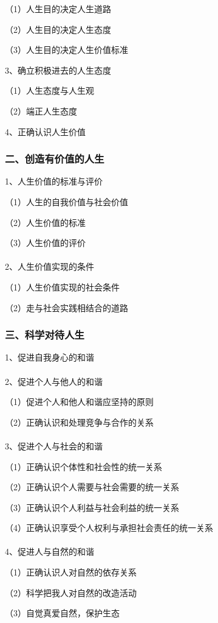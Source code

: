 \documentclass{ctexart}
\begin{document}
（1）人生目的决定人生道路

（2）人生目的决定人生态度

（3）人生目的决定人生价值标准

3、确立积极进去的人生态度

（1）人生态度与人生观

（2）端正人生态度

4、正确认识人生价值

\subsubsection{二、创造有价值的人生}

1、人生价值的标准与评价

（1）人生的自我价值与社会价值

（2）人生价值的标准

（3）人生价值的评价
\\\\

2、人生价值实现的条件

（1）人生价值实现的社会条件

（2）走与社会实践相结合的道路

\subsubsection{三、科学对待人生}
1、促进自我身心的和谐
\\\\

2、促进个人与他人的和谐

（1）促进个人和他人和谐应坚持的原则

（2）正确认识和处理竞争与合作的关系
\\\\

3、促进个人与社会的和谐

（1）正确认识个体性和社会性的统一关系

（2）正确认识个人需要与社会需要的统一关系

（3）正确认识个人利益与社会利益的统一关系

（4）正确认识享受个人权利与承担社会责任的统一关系
\\\\

4、促进人与自然的和谐

（1）正确认识人对自然的依存关系

（2）科学把我人对自然的改造活动

（3）自觉真爱自然，保护生态
\end{document}
